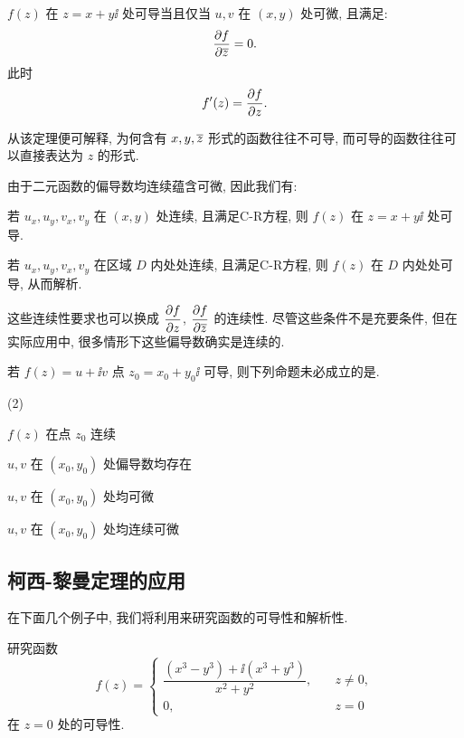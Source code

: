 \begin{theorem}[柯西-黎曼定理的等价形式]
  $f(z)$ 在 $z=x+y\ii$ 处可导当且仅当 $u,v$ 在 $(x,y)$ 处可微, 且满足:
  \[
    \pdv f{\overline z}=0.
  \]
  此时
  \[
    f'(z)=\pdv fz.
  \]
\end{theorem}

从该定理便可解释, 为何含有 $x,y,\overline z$ 形式的函数往往不可导, 而可导的函数往往可以直接表达为 $z$ 的形式.

由于二元函数的偏导数均连续蕴含可微, 因此我们有:

\begin{theorem}
  \begin{enuma}
    \item 若 $u_x,u_y,v_x,v_y$ 在 $(x,y)$ 处连续, 且满足C-R方程, 则 $f(z)$ 在 $z=x+y\ii$ 处可导.
    \item 若 $u_x,u_y,v_x,v_y$ 在区域 $D$ 内处处连续, 且满足C-R方程, 则 $f(z)$ 在 $D$ 内处处可导, 从而解析.
  \end{enuma}
\end{theorem}

这些连续性要求也可以换成 $\displaystyle \pdv fz$, $\displaystyle \pdv f{\overline z}$ 的连续性.
尽管这些条件不是充要条件, 但在实际应用中, 很多情形下这些偏导数确实是连续的.

\begin{exercise}
  若 $f(z)=u+\ii v$ 点 $z_0=x_0+y_0\ii$ 可导, 则下列命题未必成立的是\fillbrace{}.
  \begin{examplechoice}(2)
    \item $f(z)$ 在点 $z_0$ 连续
    \item $u,v$ 在 $(x_0,y_0)$ 处偏导数均存在
    \item $u,v$ 在 $(x_0,y_0)$ 处均可微
    \item $u,v$ 在 $(x_0,y_0)$ 处均连续可微
  \end{examplechoice}
\end{exercise}


\subsection{柯西-黎曼定理的应用}

在下面几个例子中, 我们将利用\thmCR 来研究函数的可导性和解析性.

\begin{example}
  研究函数
  \[
    f(z)=\begin{cases}
      \dfrac{(x^3-y^3)+\ii(x^3+y^3)}{x^2+y^2},\quad &z\neq 0,\\
      0,&z=0
    \end{cases}
  \]
  在 $z=0$ 处的可导性.
\end{example}

